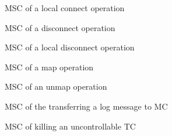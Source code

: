 \documentclass[a4paper,10pt]{article}
\begin{document}
\begin{figure}[!p]
\begin{center}
{}
\end{center}
\caption{\label{figure:connect_op_local}MSC of a local connect operation}
\end{figure}

\begin{figure}[!p]
\begin{center}
{}
\end{center}
\caption{\label{figure:disconnect_op}MSC of a disconnect operation}
\end{figure}

\begin{figure}[!p]
\begin{center}
{}
\end{center}
\caption{\label{figure:disconnect_op_local}MSC of a local disconnect operation}
\end{figure}

\begin{figure}[!p]
\begin{center}
{}
\end{center}
\caption{\label{figure:map_op}MSC of a map operation}
\end{figure}

\begin{figure}[!p]
\begin{center}
{}
\end{center}
\caption{\label{figure:unmap_op}MSC of an unmap operation}
\end{figure}

\begin{figure}[!p]
\begin{center}
{}
\end{center}
\caption{\label{figure:log}MSC of the transferring a log message to MC}
\end{figure}

\begin{figure}[!p]
\begin{center}
{}
\end{center}
\caption{\label{figure:killing_TC}MSC of killing an uncontrollable TC}
\end{figure}
\end{document}
